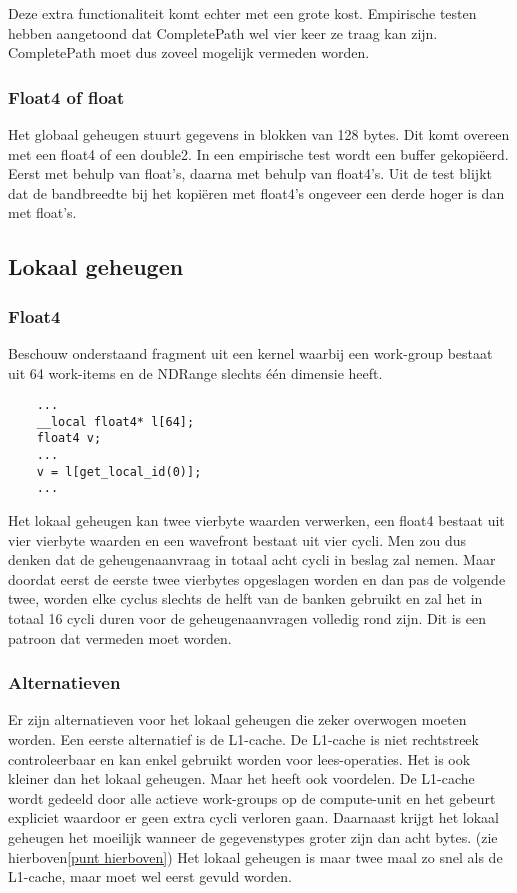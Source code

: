 Deze extra functionaliteit komt echter met een grote kost. Empirische testen  hebben aangetoond dat CompletePath wel vier keer ze traag kan zijn. CompletePath moet dus zoveel mogelijk vermeden worden.

\subsubsection{Float4 of float}
Het globaal geheugen stuurt gegevens in blokken van 128 bytes. Dit komt overeen met een float4 of een double2. In een empirische test wordt een buffer gekopi\"eerd. Eerst met behulp van float's, daarna met behulp van float4's. Uit de test blijkt dat de bandbreedte bij het kopi\"eren met float4's ongeveer een derde hoger is dan met float's. 

\subsection{Lokaal geheugen}
\subsubsection{Float4}
Beschouw onderstaand fragment uit een kernel waarbij een work-group bestaat uit 64 work-items en de NDRange slechts \'e\'en dimensie heeft.
\begin{lstlisting}
	...
    __local float4* l[64];
    float4 v;
    ...
    v = l[get_local_id(0)];
    ...
\end{lstlisting}
Het lokaal geheugen kan twee vierbyte waarden verwerken, een float4 bestaat uit vier vierbyte waarden en een wavefront bestaat uit vier cycli. Men zou dus denken dat de geheugenaanvraag in totaal acht cycli in beslag zal nemen. Maar doordat eerst de eerste twee vierbytes opgeslagen worden en dan pas de volgende twee, worden elke cyclus slechts de helft van de banken gebruikt en zal het in totaal 16 cycli duren voor de geheugenaanvragen volledig rond zijn. Dit is een patroon dat vermeden moet worden.

\subsubsection{Alternatieven}
Er zijn alternatieven voor het lokaal geheugen die zeker overwogen moeten worden. Een eerste alternatief is de L1-cache. De L1-cache is niet rechtstreek controleerbaar en kan enkel gebruikt worden voor lees-operaties. Het is ook kleiner dan het lokaal geheugen. Maar het heeft ook voordelen. De L1-cache wordt gedeeld door alle actieve work-groups op de compute-unit en het gebeurt expliciet waardoor er geen extra cycli verloren gaan. Daarnaast krijgt het lokaal geheugen het moeilijk wanneer de gegevenstypes groter zijn dan acht bytes. (zie hierboven\ref{punt hierboven}) Het lokaal geheugen is maar twee maal zo snel als de L1-cache, maar moet wel eerst gevuld worden.

